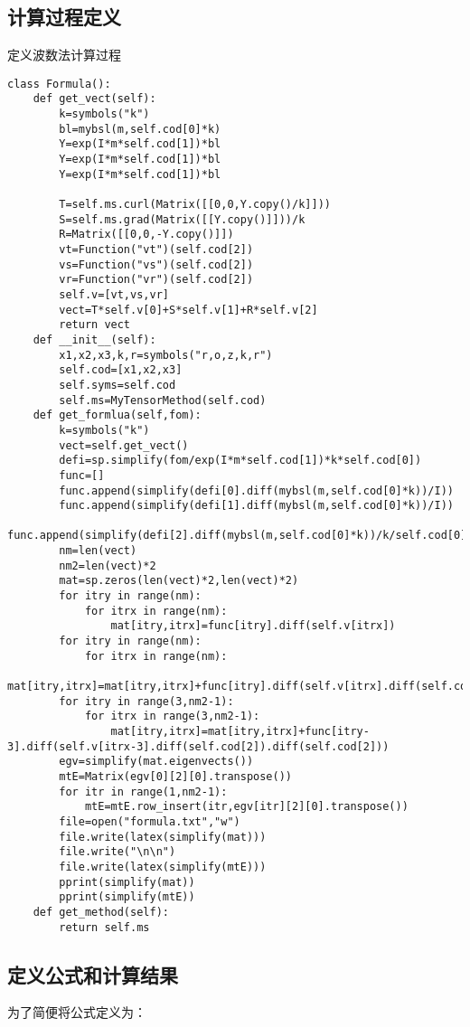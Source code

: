 \documentclass[UTF8]{article}
\begin{document}
\subsection{计算过程定义}
定义波数法计算过程
\begin{lstlisting}
class Formula():
    def get_vect(self):
        k=symbols("k")
        bl=mybsl(m,self.cod[0]*k)
        Y=exp(I*m*self.cod[1])*bl
        Y=exp(I*m*self.cod[1])*bl
        Y=exp(I*m*self.cod[1])*bl
        
        T=self.ms.curl(Matrix([[0,0,Y.copy()/k]]))
        S=self.ms.grad(Matrix([[Y.copy()]]))/k
        R=Matrix([[0,0,-Y.copy()]])
        vt=Function("vt")(self.cod[2])
        vs=Function("vs")(self.cod[2])
        vr=Function("vr")(self.cod[2])
        self.v=[vt,vs,vr]
        vect=T*self.v[0]+S*self.v[1]+R*self.v[2]
        return vect
    def __init__(self):
        x1,x2,x3,k,r=symbols("r,o,z,k,r")
        self.cod=[x1,x2,x3]
        self.syms=self.cod
        self.ms=MyTensorMethod(self.cod)
    def get_formlua(self,fom):
        k=symbols("k")
        vect=self.get_vect()
        defi=sp.simplify(fom/exp(I*m*self.cod[1])*k*self.cod[0])
        func=[]
        func.append(simplify(defi[0].diff(mybsl(m,self.cod[0]*k))/I))
        func.append(simplify(defi[1].diff(mybsl(m,self.cod[0]*k))/I))
        func.append(simplify(defi[2].diff(mybsl(m,self.cod[0]*k))/k/self.cod[0]))
        nm=len(vect)
        nm2=len(vect)*2
        mat=sp.zeros(len(vect)*2,len(vect)*2)
        for itry in range(nm):
            for itrx in range(nm):
                mat[itry,itrx]=func[itry].diff(self.v[itrx])
        for itry in range(nm):
            for itrx in range(nm):
                mat[itry,itrx]=mat[itry,itrx]+func[itry].diff(self.v[itrx].diff(self.cod[2]))
        for itry in range(3,nm2-1):
            for itrx in range(3,nm2-1):
                mat[itry,itrx]=mat[itry,itrx]+func[itry-3].diff(self.v[itrx-3].diff(self.cod[2]).diff(self.cod[2]))
        egv=simplify(mat.eigenvects())
        mtE=Matrix(egv[0][2][0].transpose())
        for itr in range(1,nm2-1):
            mtE=mtE.row_insert(itr,egv[itr][2][0].transpose())
        file=open("formula.txt","w")
        file.write(latex(simplify(mat)))
        file.write("\n\n")
        file.write(latex(simplify(mtE)))
        pprint(simplify(mat))
        pprint(simplify(mtE))
    def get_method(self):
        return self.ms
\end{lstlisting}

\subsection{定义公式和计算结果}
为了简便将公式定义为：
\end{document}
